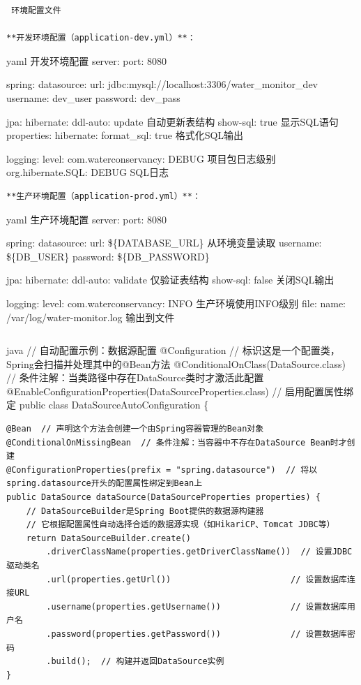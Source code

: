 \begin{lstlisting}
 环境配置文件

**开发环境配置（application-dev.yml）**：
\end{lstlisting}

yaml  开发环境配置 server: port: 8080

spring: datasource: url: jdbc:mysql://localhost:3306/water\_monitor\_dev username: dev\_user password: dev\_pass

jpa: hibernate: ddl-auto: update  自动更新表结构 show-sql: true  显示SQL语句 properties: hibernate: format\_sql: true  格式化SQL输出

logging: level: com.waterconservancy: DEBUG  项目包日志级别 org.hibernate.SQL: DEBUG  SQL日志

\begin{lstlisting}
**生产环境配置（application-prod.yml）**：
\end{lstlisting}

yaml  生产环境配置 server: port: 8080

spring: datasource: url: \$\{DATABASE\_URL\}  从环境变量读取 username: \$\{DB\_USER\} password: \$\{DB\_PASSWORD\}

jpa: hibernate: ddl-auto: validate  仅验证表结构 show-sql: false  关闭SQL输出

logging: level: com.waterconservancy: INFO  生产环境使用INFO级别 file: name: /var/log/water-monitor.log  输出到文件

\begin{lstlisting}

\end{lstlisting}

java // 自动配置示例：数据源配置 @Configuration // 标识这是一个配置类，Spring会扫描并处理其中的@Bean方法 @ConditionalOnClass(DataSource.class) // 条件注解：当类路径中存在DataSource类时才激活此配置 @EnableConfigurationProperties(DataSourceProperties.class) // 启用配置属性绑定 public class DataSourceAutoConfiguration \{

\begin{verbatim}
@Bean  // 声明这个方法会创建一个由Spring容器管理的Bean对象
@ConditionalOnMissingBean  // 条件注解：当容器中不存在DataSource Bean时才创建
@ConfigurationProperties(prefix = "spring.datasource")  // 将以spring.datasource开头的配置属性绑定到Bean上
public DataSource dataSource(DataSourceProperties properties) {
    // DataSourceBuilder是Spring Boot提供的数据源构建器
    // 它根据配置属性自动选择合适的数据源实现（如HikariCP、Tomcat JDBC等）
    return DataSourceBuilder.create()
        .driverClassName(properties.getDriverClassName())  // 设置JDBC驱动类名
        .url(properties.getUrl())                        // 设置数据库连接URL
        .username(properties.getUsername())              // 设置数据库用户名
        .password(properties.getPassword())              // 设置数据库密码
        .build();  // 构建并返回DataSource实例
}
\end{verbatim}

